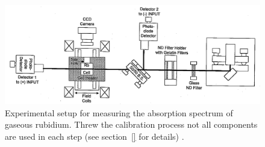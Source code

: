 \begin{figure}
\centering
\includegraphics[width = \textwidth]{pics/setup.png}
\caption{Experimental setup for measuring the absorption spectrum of gaseous rubidium. Threw the calibration 
process not all components are used in each step (see section~\ref{} for details) \cite{anleitung60}. }
\label{fig: setup}
\end{figure}



